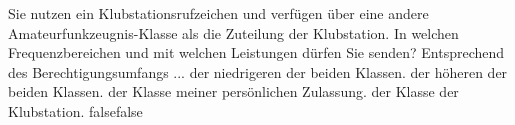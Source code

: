     {Sie nutzen ein Klubstationsrufzeichen und verfügen über eine andere Amateurfunkzeugnis-Klasse als die Zuteilung der Klubstation. In welchen Frequenzbereichen und mit welchen Leistungen dürfen Sie senden? Entsprechend des Berechtigungsumfangs ...}
    {der niedrigeren der beiden Klassen.}
    {der höheren der beiden Klassen.}
    {der Klasse meiner persönlichen Zulassung.}
    {der Klasse der Klubstation.}
    {false}{false}